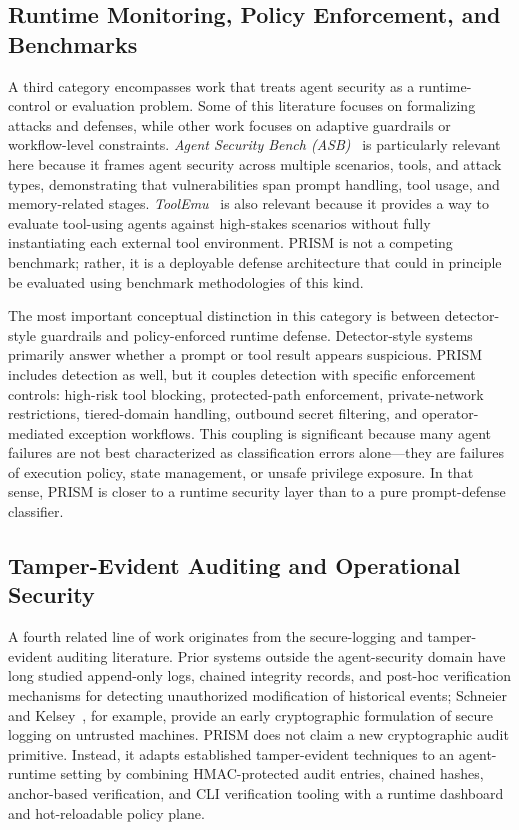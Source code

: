 \subsection{Runtime Monitoring, Policy Enforcement, and Benchmarks}

A third category encompasses work that treats agent security as a runtime-control or evaluation problem. Some of this literature focuses on formalizing attacks and defenses, while other work focuses on adaptive guardrails or workflow-level constraints. \emph{Agent Security Bench (ASB)}~\cite{asb2024} is particularly relevant here because it frames agent security across multiple scenarios, tools, and attack types, demonstrating that vulnerabilities span prompt handling, tool usage, and memory-related stages. \emph{ToolEmu}~\cite{toolemu2023} is also relevant because it provides a way to evaluate tool-using agents against high-stakes scenarios without fully instantiating each external tool environment. PRISM is not a competing benchmark; rather, it is a deployable defense architecture that could in principle be evaluated using benchmark methodologies of this kind.

The most important conceptual distinction in this category is between detector-style guardrails and policy-enforced runtime defense. Detector-style systems primarily answer whether a prompt or tool result appears suspicious. PRISM includes detection as well, but it couples detection with specific enforcement controls: high-risk tool blocking, protected-path enforcement, private-network restrictions, tiered-domain handling, outbound secret filtering, and operator-mediated exception workflows. This coupling is significant because many agent failures are not best characterized as classification errors alone---they are failures of execution policy, state management, or unsafe privilege exposure. In that sense, PRISM is closer to a runtime security layer than to a pure prompt-defense classifier.

\subsection{Tamper-Evident Auditing and Operational Security}

A fourth related line of work originates from the secure-logging and tamper-evident auditing literature. Prior systems outside the agent-security domain have long studied append-only logs, chained integrity records, and post-hoc verification mechanisms for detecting unauthorized modification of historical events; Schneier and Kelsey~\cite{schneierkelsey1998}, for example, provide an early cryptographic formulation of secure logging on untrusted machines. PRISM does not claim a new cryptographic audit primitive. Instead, it adapts established tamper-evident techniques to an agent-runtime setting by combining HMAC-protected audit entries, chained hashes, anchor-based verification, and CLI verification tooling with a runtime dashboard and hot-reloadable policy plane.

